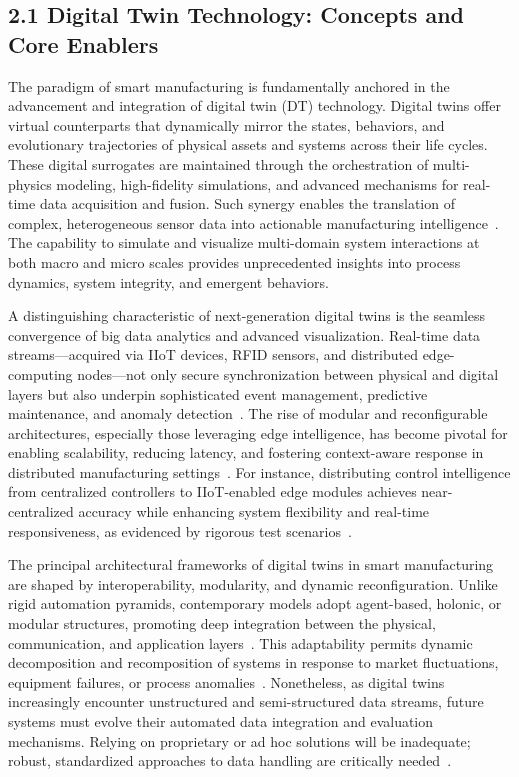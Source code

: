 \documentclass[11pt]{article}
\begin{document}
\subsection{2.1 Digital Twin Technology: Concepts and Core Enablers}

The paradigm of smart manufacturing is fundamentally anchored in the advancement and integration of digital twin (DT) technology. Digital twins offer virtual counterparts that dynamically mirror the states, behaviors, and evolutionary trajectories of physical assets and systems across their life cycles. These digital surrogates are maintained through the orchestration of multi-physics modeling, high-fidelity simulations, and advanced mechanisms for real-time data acquisition and fusion. Such synergy enables the translation of complex, heterogeneous sensor data into actionable manufacturing intelligence~\cite{ref91}. The capability to simulate and visualize multi-domain system interactions at both macro and micro scales provides unprecedented insights into process dynamics, system integrity, and emergent behaviors.

A distinguishing characteristic of next-generation digital twins is the seamless convergence of big data analytics and advanced visualization. Real-time data streams—acquired via IIoT devices, RFID sensors, and distributed edge-computing nodes—not only secure synchronization between physical and digital layers but also underpin sophisticated event management, predictive maintenance, and anomaly detection~\cite{ref4,ref8,ref11,ref12,ref13,ref14,ref16,ref18,ref19,ref20,ref27,ref28,ref29,ref30,ref36,ref38,ref41,ref43,ref44,ref45,ref57,ref59,ref91}. The rise of modular and reconfigurable architectures, especially those leveraging edge intelligence, has become pivotal for enabling scalability, reducing latency, and fostering context-aware response in distributed manufacturing settings~\cite{ref91}. For instance, distributing control intelligence from centralized controllers to IIoT-enabled edge modules achieves near-centralized accuracy while enhancing system flexibility and real-time responsiveness, as evidenced by rigorous test scenarios~\cite{ref3}.

The principal architectural frameworks of digital twins in smart manufacturing are shaped by interoperability, modularity, and dynamic reconfiguration. Unlike rigid automation pyramids, contemporary models adopt agent-based, holonic, or modular structures, promoting deep integration between the physical, communication, and application layers~\cite{ref25}. This adaptability permits dynamic decomposition and recomposition of systems in response to market fluctuations, equipment failures, or process anomalies~\cite{ref3}. Nonetheless, as digital twins increasingly encounter unstructured and semi-structured data streams, future systems must evolve their automated data integration and evaluation mechanisms. Relying on proprietary or ad hoc solutions will be inadequate; robust, standardized approaches to data handling are critically needed~\cite{ref91}.
\end{document}
